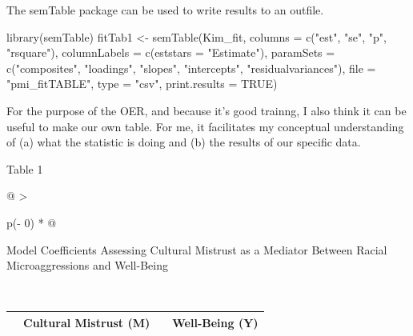 \documentclass[
  11pt,
]{book}
\newenvironment{Shaded}{\begin{snugshade}}{\end{snugshade}}
\newcommand{\AttributeTok}[1]{\textcolor[rgb]{0.77,0.63,0.00}{#1}}
\newcommand{\ConstantTok}[1]{\textcolor[rgb]{0.00,0.00,0.00}{#1}}
\newcommand{\FunctionTok}[1]{\textcolor[rgb]{0.00,0.00,0.00}{#1}}
\newcommand{\NormalTok}[1]{#1}
\newcommand{\OtherTok}[1]{\textcolor[rgb]{0.56,0.35,0.01}{#1}}
\newcommand{\StringTok}[1]{\textcolor[rgb]{0.31,0.60,0.02}{#1}}
\begin{document}
The semTable package can be used to write results to an outfile.

\begin{Shaded}
\begin{Highlighting}[]
\FunctionTok{library}\NormalTok{(semTable)}
\NormalTok{fitTab1 }\OtherTok{\textless{}{-}} \FunctionTok{semTable}\NormalTok{(Kim\_fit, }\AttributeTok{columns =} \FunctionTok{c}\NormalTok{(}\StringTok{"est"}\NormalTok{, }\StringTok{"se"}\NormalTok{, }\StringTok{"p"}\NormalTok{, }\StringTok{"rsquare"}\NormalTok{),  }\AttributeTok{columnLabels =} \FunctionTok{c}\NormalTok{(}\AttributeTok{eststars =} \StringTok{"Estimate"}\NormalTok{), }\AttributeTok{paramSets =} \FunctionTok{c}\NormalTok{(}\StringTok{"composites"}\NormalTok{, }\StringTok{"loadings"}\NormalTok{, }\StringTok{"slopes"}\NormalTok{, }\StringTok{"intercepts"}\NormalTok{, }\StringTok{"residualvariances"}\NormalTok{), }\AttributeTok{file =} \StringTok{"pmi\_fitTABLE"}\NormalTok{, }\AttributeTok{type =} \StringTok{"csv"}\NormalTok{, }\AttributeTok{print.results =} \ConstantTok{TRUE}\NormalTok{)}
\end{Highlighting}
\end{Shaded}

For the purpose of the OER, and because it's good trainng, I also think it can be useful to make our own table. For me, it facilitates my conceptual understanding of (a) what the statistic is doing and (b) the results of our specific data.

Table 1

\begin{longtable}[]{@{}
  >{\raggedright\arraybackslash}p{(\columnwidth - 0\tabcolsep) * }@{}}
\toprule
\begin{minipage}[b]{\linewidth}\raggedright
Model Coefficients Assessing Cultural Mistrust as a Mediator Between Racial Microaggressions and Well-Being
\end{minipage} \\
\midrule
\endhead
\bottomrule
\end{longtable}

\begin{longtable}[]{@{}
  >{\raggedright\arraybackslash}p{}
  >{\centering\arraybackslash}p{}
  >{\centering\arraybackslash}p{}
  >{\centering\arraybackslash}p{}@{}}
\toprule
\endhead
& Cultural Mistrust (M) & & Well-Being (Y) \\
\bottomrule
\end{longtable}
\end{document}
